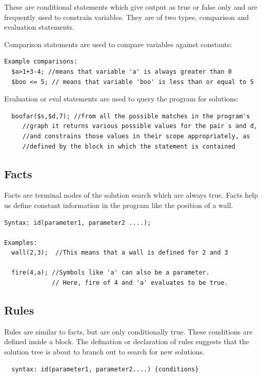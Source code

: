\documentclass[onecolumn,titlepage]{article}
\begin{document}
These are conditional statements which give output as true or false
only and are frequently used to constrain variables. They are of two
types, comparison and evaluation statements.

Comparison statements are used to compare variables against constants:

\begin{verbatim}
Example comparisons:
  $a>1+3-4; //means that variable 'a' is always greater than 0
  $boo <= 5; // means that variable 'boo' is less than or equal to 5
\end{verbatim}

Evaluation or eval statements are used to query the program for solutions:

\begin{verbatim}
  boofar($s,$d,7); //from all the possible matches in the program's
     //graph it returns various possible values for the pair s and d,
     //and constrains those values in their scope appropriately, as 
     //defined by the block in which the statement is contained
\end{verbatim}

\subsection{Facts}

Facts are terminal nodes of the solution search which are always
true. Facts help us define constant information in the program like
the position of a wall.

\begin{verbatim}
Syntax: id(parameter1, parameter2 ....);

Examples:
  wall(2,3);  //This means that a wall is defined for 2 and 3

  fire(4,a); //Symbols like 'a' can also be a parameter.
             // Here, fire of 4 and 'a' evaluates to be true.
\end{verbatim}


\subsection{Rules}
Rules are similar to facts, but are only conditionally true. These
conditions are defined inside a block. The defination or declaration
of rules suggests that the solution tree is about to branch out to
search for new solutions.


\begin{verbatim}
  syntax: id(parameter1, parameter2....) {conditions}
\end{verbatim}
\end{document}
